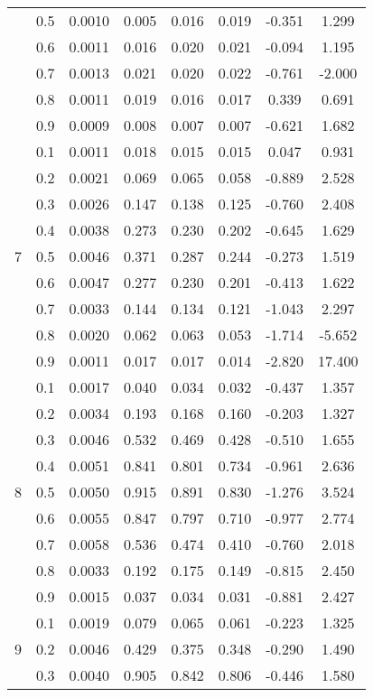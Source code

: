 \documentclass[11pt,a4paper]{report}
\begin{document}
\begin{longtable}{ | c | c || c | c | c | c | c | c | }
 & 0.5 & 0.0010 & 0.005 & 0.016 & 0.019 & -0.351 & 1.299 \\
 & 0.6 & 0.0011 & 0.016 & 0.020 & 0.021 & -0.094 & 1.195 \\
 & 0.7 & 0.0013 & 0.021 & 0.020 & 0.022 & -0.761 & -2.000 \\
 & 0.8 & 0.0011 & 0.019 & 0.016 & 0.017 & 0.339 & 0.691 \\
 & 0.9 & 0.0009 & 0.008 & 0.007 & 0.007 & -0.621 & 1.682 \\
 \hline
\multirow{9}{*}{7} & 0.1 & 0.0011 & 0.018 & 0.015 & 0.015 & 0.047 & 0.931 \\
 & 0.2 & 0.0021 & 0.069 & 0.065 & 0.058 & -0.889 & 2.528 \\
 & 0.3 & 0.0026 & 0.147 & 0.138 & 0.125 & -0.760 & 2.408 \\
 & 0.4 & 0.0038 & 0.273 & 0.230 & 0.202 & -0.645 & 1.629 \\
 & 0.5 & 0.0046 & 0.371 & 0.287 & 0.244 & -0.273 & 1.519 \\
 & 0.6 & 0.0047 & 0.277 & 0.230 & 0.201 & -0.413 & 1.622 \\
 & 0.7 & 0.0033 & 0.144 & 0.134 & 0.121 & -1.043 & 2.297 \\
 & 0.8 & 0.0020 & 0.062 & 0.063 & 0.053 & -1.714 & -5.652 \\
 & 0.9 & 0.0011 & 0.017 & 0.017 & 0.014 & -2.820 & 17.400 \\
 \hline
\multirow{9}{*}{8} & 0.1 & 0.0017 & 0.040 & 0.034 & 0.032 & -0.437 & 1.357 \\
 & 0.2 & 0.0034 & 0.193 & 0.168 & 0.160 & -0.203 & 1.327 \\
 & 0.3 & 0.0046 & 0.532 & 0.469 & 0.428 & -0.510 & 1.655 \\
 & 0.4 & 0.0051 & 0.841 & 0.801 & 0.734 & -0.961 & 2.636 \\
 & 0.5 & 0.0050 & 0.915 & 0.891 & 0.830 & -1.276 & 3.524 \\
 & 0.6 & 0.0055 & 0.847 & 0.797 & 0.710 & -0.977 & 2.774 \\
 & 0.7 & 0.0058 & 0.536 & 0.474 & 0.410 & -0.760 & 2.018 \\
 & 0.8 & 0.0033 & 0.192 & 0.175 & 0.149 & -0.815 & 2.450 \\
 & 0.9 & 0.0015 & 0.037 & 0.034 & 0.031 & -0.881 & 2.427 \\
 \hline
\multirow{9}{*}{9} & 0.1 & 0.0019 & 0.079 & 0.065 & 0.061 & -0.223 & 1.325 \\
 & 0.2 & 0.0046 & 0.429 & 0.375 & 0.348 & -0.290 & 1.490 \\
 & 0.3 & 0.0040 & 0.905 & 0.842 & 0.806 & -0.446 & 1.580 \\

\end{longtable}
\end{document}
